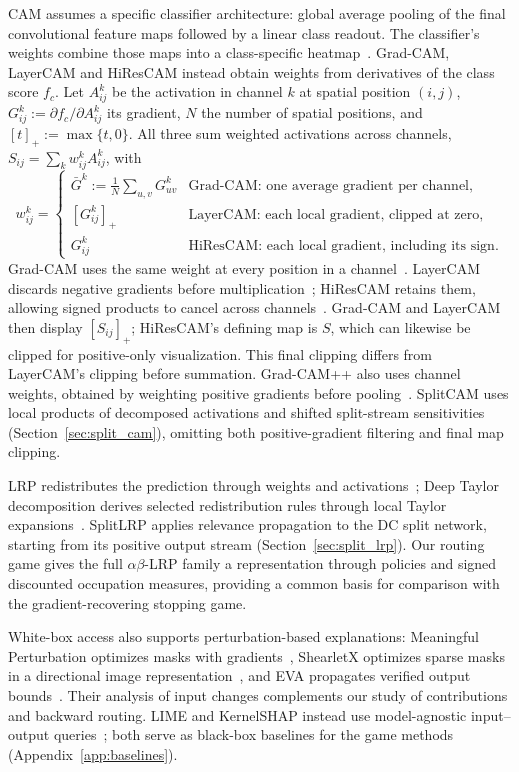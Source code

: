 CAM assumes a specific classifier architecture: global average pooling of the final convolutional feature maps followed by a linear class readout. The classifier's weights combine those maps into a class-specific heatmap~\parencite{Zhou2016}. Grad-CAM, LayerCAM and HiResCAM instead obtain weights from derivatives of the class score $f_c$. Let $A^k_{ij}$ be the activation in channel $k$ at spatial position $(i,j)$, $G^k_{ij}:=\partial f_c/\partial A^k_{ij}$ its gradient, $N$ the number of spatial positions, and $[t]_+:=\max\{t,0\}$. All three sum weighted activations across channels, $S_{ij}=\sum_k w^k_{ij}A^k_{ij}$, with
\[
 w^k_{ij}=\begin{cases}
 \displaystyle\bar G^k:=\frac{1}{N}\sum_{u,v}G^k_{uv}
   & \text{Grad-CAM: one average gradient per channel},\\[1mm]
 [G^k_{ij}]_+ & \text{LayerCAM: each local gradient, clipped at zero},\\[1mm]
 G^k_{ij} & \text{HiResCAM: each local gradient, including its sign}.
 \end{cases}
\]
Grad-CAM uses the same weight at every position in a channel~\parencite{Selvaraju2017}. LayerCAM discards negative gradients before multiplication~\parencite{Jiang2021LayerCAM}; HiResCAM retains them, allowing signed products to cancel across channels~\parencite{Draelos2020hirescam}. Grad-CAM and LayerCAM then display $[S_{ij}]_+$; HiResCAM's defining map is $S$, which can likewise be clipped for positive-only visualization. This final clipping differs from LayerCAM's clipping before summation. Grad-CAM++ also uses channel weights, obtained by weighting positive gradients before pooling~\parencite{Chattopadhay2018}. SplitCAM uses local products of decomposed activations and shifted split-stream sensitivities (Section~\ref{sec:split_cam}), omitting both positive-gradient filtering and final map clipping.

LRP redistributes the prediction through weights and activations~\parencite{Bach2015,Montavon2018}; Deep Taylor decomposition derives selected redistribution rules through local Taylor expansions~\parencite{Montavon2017DeepTaylor}. SplitLRP applies relevance propagation to the DC split network, starting from its positive output stream (Section~\ref{sec:split_lrp}). Our routing game gives the full $\alpha\beta$-LRP family a representation through policies and signed discounted occupation measures, providing a common basis for comparison with the gradient-recovering stopping game.

White-box access also supports perturbation-based explanations: Meaningful Perturbation optimizes masks with gradients~\parencite{FongVedaldi2017}, ShearletX optimizes sparse masks in a directional image representation~\parencite{Kolek2023_ShearletX}, and EVA propagates verified output bounds~\parencite{Fel2023_EVA}. Their analysis of input changes complements our study of contributions and backward routing. LIME and KernelSHAP instead use model-agnostic input--output queries~\parencite{Ribeiro2016,LundbergLee2017}; both serve as black-box baselines for the game methods (Appendix~\ref{app:baselines}).

